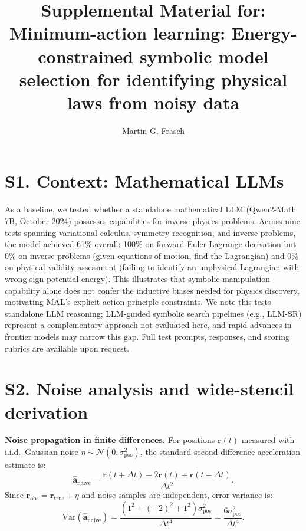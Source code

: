 \documentclass[aps,pre,reprint,superscriptaddress]{revtex4-2}
\begin{document}
\title{Supplemental Material for: Minimum-action learning: Energy-constrained symbolic model selection for identifying physical laws from noisy data}

\author{Martin G. Frasch}

\maketitle

\section{S1. Context: Mathematical LLMs}
As a baseline, we tested whether a standalone mathematical LLM (Qwen2-Math 7B, October 2024) possesses capabilities for inverse physics problems. Across nine tests spanning variational calculus, symmetry recognition, and inverse problems, the model achieved 61\% overall: 100\% on forward Euler-Lagrange derivation but 0\% on inverse problems (given equations of motion, find the Lagrangian) and 0\% on physical validity assessment (failing to identify an unphysical Lagrangian with wrong-sign potential energy). This illustrates that symbolic manipulation capability alone does not confer the inductive biases needed for physics discovery, motivating MAL's explicit action-principle constraints. We note this tests standalone LLM reasoning; LLM-guided symbolic search pipelines (e.g., LLM-SR) represent a complementary approach not evaluated here, and rapid advances in frontier models may narrow this gap. Full test prompts, responses, and scoring rubrics are available upon request.

\section{S2. Noise analysis and wide-stencil derivation}
\textbf{Noise propagation in finite differences.} For positions $\mathbf{r}(t)$ measured with i.i.d.\ Gaussian noise $\eta \sim \mathcal{N}(0, \sigma_{\text{pos}}^2)$, the standard second-difference acceleration estimate is:
\begin{equation}
\hat{\mathbf{a}}_{\text{naive}} = \frac{\mathbf{r}(t+\Delta t) - 2\mathbf{r}(t) + \mathbf{r}(t-\Delta t)}{\Delta t^2}.
\end{equation}
Since $\mathbf{r}_{\text{obs}} = \mathbf{r}_{\text{true}} + \eta$ and noise samples are independent, error variance is:
\begin{equation}
\text{Var}(\hat{\mathbf{a}}_{\text{naive}}) = \frac{(1^2 + (-2)^2 + 1^2) \sigma_{\text{pos}}^2}{\Delta t^4} = \frac{6\sigma_{\text{pos}}^2}{\Delta t^4}.
\end{equation}
\end{document}
